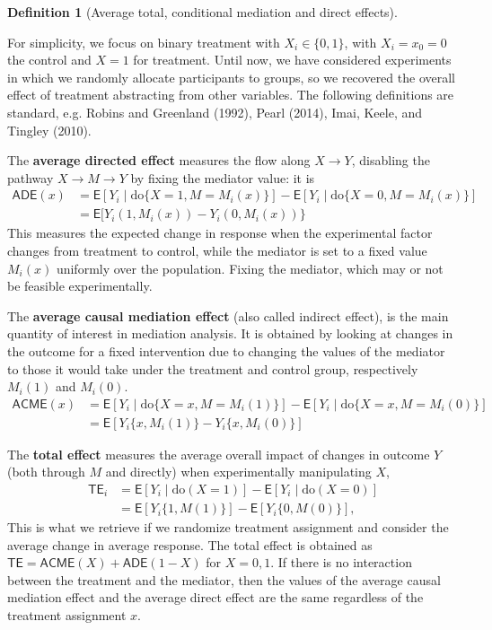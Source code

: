 \documentclass[
  11pt,
  letterpaper,
]{scrbook}
\theoremstyle{definition}
\theoremstyle{definition}
\newtheorem{definition}{Definition}[chapter]
\theoremstyle{remark}
\begin{document}
\begin{definition}[Average total, conditional mediation and direct
effects]\protect\hypertarget{def-ate}{}\label{def-ate}

For simplicity, we focus on binary treatment with \(X_i \in \{0,1\}\),
with \(X_i=x_0=0\) the control and \(X=1\) for treatment. Until now, we
have considered experiments in which we randomly allocate participants
to groups, so we recovered the overall effect of treatment abstracting
from other variables. The following definitions are standard, e.g.
Robins and Greenland (1992), Pearl (2014), Imai, Keele, and Tingley
(2010).

The \textbf{average directed effect} measures the flow along
\(X \rightarrow Y\), disabling the pathway \(X \to M \to Y\) by fixing
the mediator value: it is \begin{align*}
\mathsf{ADE}(x) &= 
\mathsf{E}[Y_i \mid \text{do}\{X=1, M=M_i(x)\}] - \mathsf{E}[Y_i \mid \text{do}\{X=0, M=M_i(x)\}] \\&= \mathsf{E}[Y_i(1,M_i(x)) -Y_i(0, M_i(x))\}
\end{align*} This measures the expected change in response when the
experimental factor changes from treatment to control, while the
mediator is set to a fixed value \(M_i(x)\) uniformly over the
population. Fixing the mediator, which may or not be feasible
experimentally.

The \textbf{average causal mediation effect} (also called indirect
effect), is the main quantity of interest in mediation analysis. It is
obtained by looking at changes in the outcome for a fixed intervention
due to changing the values of the mediator to those it would take under
the treatment and control group, respectively \(M_i(1)\) and \(M_i(0)\).
\begin{align*}
\mathsf{ACME}(x) &= 
\mathsf{E}[Y_i \mid \text{do}\{X=x, M=M_i(1)\}] - \mathsf{E}[Y_i \mid \text{do}\{X=x, M=M_i(0)\}] \\&= \mathsf{E}[Y_i\{x, M_i(1)\} -Y_i\{x, M_i(0)\}]
\end{align*}

The \textbf{total effect} measures the average overall impact of changes
in outcome \(Y\) (both through \(M\) and directly) when experimentally
manipulating \(X\), \begin{align*}
\mathsf{TE}_i &= \mathsf{E}[ Y_i \mid \text{do}(X=1)] - \mathsf{E}[ Y_i \mid \text{do}(X=0)]
\\ &= \mathsf{E}[Y_i\{1, M(1)\}] - \mathsf{E}[Y_i\{0, M(0)\}],
\end{align*} This is what we retrieve if we randomize treatment
assignment and consider the average change in average response. The
total effect is obtained as
\(\mathsf{TE} = \mathsf{ACME}(X) + \mathsf{ADE}(1-X)\) for \(X=0,1.\) If
there is no interaction between the treatment and the mediator, then the
values of the average causal mediation effect and the average direct
effect are the same regardless of the treatment assignment \(x\).

\end{definition}
\end{document}
